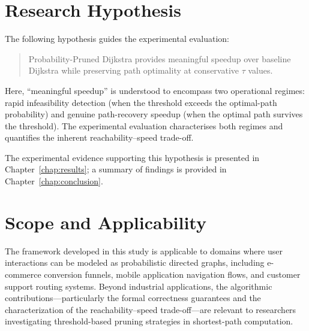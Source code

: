 \section{Research Hypothesis}

The following hypothesis guides the experimental evaluation:

\begin{quote}
Probability-Pruned Dijkstra provides meaningful speedup over baseline Dijkstra while preserving path optimality at conservative $\tau$ values.
\end{quote}

\noindent Here, ``meaningful speedup'' is understood to encompass two operational regimes: rapid infeasibility detection (when the threshold exceeds the optimal-path probability) and genuine path-recovery speedup (when the optimal path survives the threshold). The experimental evaluation characterises both regimes and quantifies the inherent reachability--speed trade-off.

\noindent The experimental evidence supporting this hypothesis is presented in Chapter~\ref{chap:results}; a summary of findings is provided in Chapter~\ref{chap:conclusion}.

\section{Scope and Applicability}

The framework developed in this study is applicable to domains where user interactions can be modeled as probabilistic directed graphs, including e-commerce conversion funnels, mobile application navigation flows, and customer support routing systems. Beyond industrial applications, the algorithmic contributions---particularly the formal correctness guarantees and the characterization of the reachability--speed trade-off---are relevant to researchers investigating threshold-based pruning strategies in shortest-path computation.
